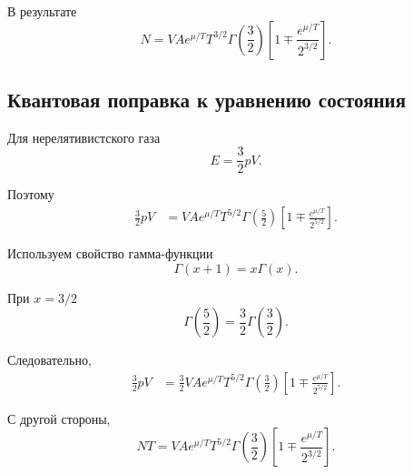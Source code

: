 \documentclass[../final.tex]{subfiles}
\begin{document}
В результате
%
\[
    \boxed{
        N
        =
        VAe^{\mu/T}
        T^{3/2}
        \Gamma
        \left(
            \frac{3}{2}
        \right)
        \left[
            1
            \mp
            \frac{
                e^{\mu/T}
            }{
                2^{3/2}
            }
        \right]
    }.
\]


\subsection{Квантовая поправка к уравнению состояния}

Для нерелятивистского газа
%
\begin{equation*}
    E
    =
    \frac{3}{2}pV.
\end{equation*}

Поэтому
%
\begin{align*}
    \frac{3}{2}pV
    &=
    VAe^{\mu/T}
    T^{5/2}
    \Gamma
    \left(
        \frac{5}{2}
    \right)
    \left[
        1
        \mp
        \frac{
            e^{\mu/T}
        }{
            2^{5/2}
        }
    \right].
\end{align*}

Используем свойство гамма-функции
%
\begin{equation*}
    \Gamma(x+1)
    =
    x\Gamma(x).
\end{equation*}

При $x=3/2$
%
\begin{equation*}
    \Gamma
    \left(
        \frac{5}{2}
    \right)
    =
    \frac{3}{2}
    \Gamma
    \left(
        \frac{3}{2}
    \right).
\end{equation*}

Следовательно,
%
\begin{align*}
    \frac{3}{2}pV
    &=
    \frac{3}{2}
    VAe^{\mu/T}
    T^{5/2}
    \Gamma
    \left(
        \frac{3}{2}
    \right)
    \left[
        1
        \mp
        \frac{
            e^{\mu/T}
        }{
            2^{5/2}
        }
    \right].
\end{align*}

С другой стороны,
%
\begin{equation*}
    NT
    =
    VAe^{\mu/T}
    T^{5/2}
    \Gamma
    \left(
        \frac{3}{2}
    \right)
    \left[
        1
        \mp
        \frac{
            e^{\mu/T}
        }{
            2^{3/2}
        }
    \right].
\end{equation*}
\end{document}
